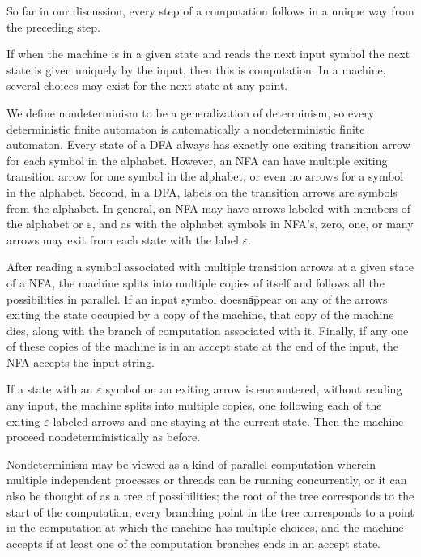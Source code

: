 \documentclass[12pt, a4paper, oneside, openright, titlepage]{book}
\begin{document}
So far in our discussion, every step of a computation follows in a unique way from the preceding step. 

\begin{defn}
    If when the machine is in a given state and reads the next input symbol the next state is given uniquely by the input, then this is  computation. In a  machine, several choices may exist for the next state at any point.
\end{defn}

We define nondeterminism to be a generalization of determinism, so every deterministic finite automaton is automatically a nondeterministic finite automaton. Every state of a DFA always has exactly one exiting transition arrow for each symbol in the alphabet. However, an NFA can have multiple exiting transition arrow for one symbol in the alphabet, or even no arrows for a symbol in the alphabet. Second, in a DFA, labels on the transition arrows are symbols from the alphabet. In general, an NFA may have arrows labeled with members of the alphabet or $\varepsilon$, and as with the alphabet symbols in NFA's, zero, one, or many arrows may exit from each state with the label $\varepsilon$.


After reading a symbol associated with multiple transition arrows at a given state of a NFA, the machine splits into multiple copies of itself and follows all the possibilities in parallel. If an input symbol doesn\t appear on any of the arrows exiting the state occupied by a copy of the machine, that copy of the machine dies, along with the branch of computation associated with it. Finally, if any one of these copies of the machine is in an accept state at the end of the input, the NFA accepts the input string.

If a state with an $\varepsilon$ symbol on an exiting arrow is encountered, without reading any input, the machine splits into multiple copies, one following each of the exiting $\varepsilon$-labeled arrows and one staying at the current state. Then the machine proceed nondeterministically as before.

Nondeterminism may be viewed as a kind of parallel computation wherein multiple independent processes or threads can be running concurrently, or it can also be thought of as a tree of possibilities; the root of the tree corresponds to the start of the computation, every branching point in the tree corresponds to a point in the computation at which the machine has multiple choices, and the machine accepts if at least one of the computation branches ends in an accept state.
\end{document}
